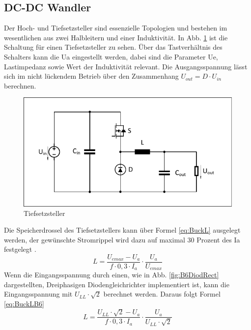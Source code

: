 		\subsection{DC-DC Wandler}
		Der Hoch- und Tiefsetzsteller sind essenzielle Topologien und bestehen im wesentlichen aus zwei Halbleitern und einer Induktivität. In Abb. \ref{fig:buck} ist die Schaltung für einen Tiefsetzsteller zu sehen. Über das Tastverhältnis des Schalters kann die \gls{Ua} eingestellt werden, dabei sind die Parameter \gls{Ue}, Lastimpedanz sowie Wert der Induktivität relevant. Die Ausgangsspannung lässt sich im nicht lückendem Betrieb über den Zusammenhang $U_{out}=D\cdot U_{in} $ berechnen.\\
		\begin{figure}
			\centering
			\includegraphics[width=0.7\linewidth]{content/Grafiken/Buck}
			\caption[Tiefsetzsteller]{Tiefsetzsteller}
			\label{fig:buck}
		\end{figure}
		Die Speicherdrossel des Tiefsetzstellers kann über Formel \ref{eq:BuckL} ausgelegt werden, der gewünschte Stromrippel wird dazu auf maximal 30 Prozent des \gls{Ia} festgelegt \cite{schmidt-walter}.
		\begin{equation}
			\label{eq:BuckL}
			L=\dfrac{U_{emax}-U_{a}}{f\cdot 0,3 \cdot I_{a}}\cdot \dfrac{U_{a}}{U_{emax}}
		\end{equation}
		Wenn die Eingangsspannung durch einen, wie in Abb. \ref{fig:B6DiodRect} dargestellten, Dreiphasigen Diodengleichrichter implementiert ist, kann die Eingangsspannung mit $U_{LL} \cdot \sqrt{2}$ berechnet werden. Daraus folgt Formel \ref{eq:BuckLB6}
		\begin{equation}
			\label{eq:BuckLB6}
			L=\dfrac{U_{LL} \cdot \sqrt{2}-U_{a}}{f\cdot 0,3 \cdot I_{a}}\cdot \dfrac{U_{a}}{U_{LL} \cdot \sqrt{2}}
		\end{equation}
			
